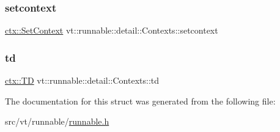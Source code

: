 \subsubsection{\texorpdfstring{setcontext}{setcontext}}
{\footnotesize\ttfamily \hyperlink{structvt_1_1ctx_1_1_set_context}{ctx\+::\+Set\+Context} vt\+::runnable\+::detail\+::\+Contexts\+::setcontext}

\mbox{\label{structvt_1_1runnable_1_1detail_1_1_contexts_a055d4227bbc6253dcfd915bf5b38cfc0}} 
\subsubsection{\texorpdfstring{td}{td}}
{\footnotesize\ttfamily \hyperlink{structvt_1_1ctx_1_1_t_d}{ctx\+::\+TD} vt\+::runnable\+::detail\+::\+Contexts\+::td}



The documentation for this struct was generated from the following file\+:\begin{DoxyCompactItemize}
\item 
src/vt/runnable/\hyperlink{runnable_8h}{runnable.\+h}\end{DoxyCompactItemize}
